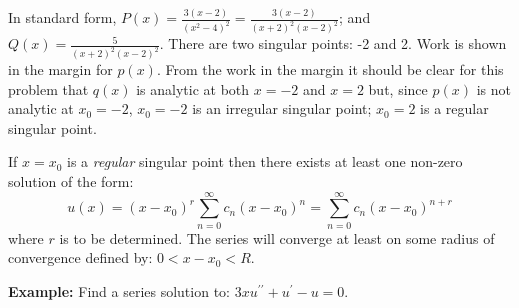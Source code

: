\noindent In standard form, $P(x) = \frac{3(x-2)}{(x^2-4)^2} = \frac{3(x-2)}{(x+2)^2(x-2)^2}$; and $Q(x) = \frac{5}{(x+2)^2(x-2)^2}$.  There are two singular points: -2 and 2.
Work is shown in the margin for $p(x)$.  From the work in the margin it should be clear for this problem that $q(x)$ is analytic at both $x=-2$ and $x=2$ but, since $p(x)$ is not analytic at $x_0=-2$, $x_0=-2$ is an irregular singular point; $x_0=2$ is a regular singular point.

\begin{theorem}
If $x=x_0$ is a \emph{regular} singular point then there exists at least one non-zero solution of the form:
$$u(x) = (x-x_0)^r\sum\limits_{n=0}^{\infty}c_n(x-x_0)^n = \sum\limits_{n=0}^{\infty}c_n(x-x_0)^{n+r}$$
where $r$ is to be determined.  The series will converge at least on some radius of convergence defined by: $0<x-x_0<R$.
\label{thm:frobenius}
\end{theorem}

\vspace{0.5cm}

\noindent\textbf{Example:} Find a series solution to: $3xu^{\prime \prime} + u^{\prime} - u = 0$.

